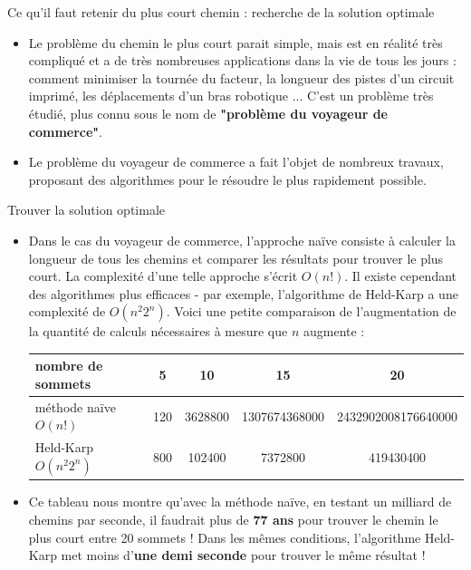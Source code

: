 \begin{frame}{Ce qu'il faut retenir du plus court chemin : recherche de la solution optimale}
  
  \begin{itemize}
    \item Le problème du chemin le plus court parait simple, mais est en réalité très compliqué et a de très nombreuses applications dans la vie de tous les jours : comment minimiser la tournée du facteur, la longueur des pistes d'un circuit imprimé, les déplacements d'un bras robotique ... C'est un problème très étudié, plus connu sous le nom de \textbf{"problème du voyageur de commerce"}.
    \item Le problème du voyageur de commerce a fait l'objet de nombreux travaux, proposant des algorithmes pour le résoudre le plus rapidement possible.
  \end{itemize}

  \begin{block}{Trouver la solution optimale}
    
    \begin{itemize}
      \item Dans le cas du voyageur de commerce, l'approche naïve consiste à calculer la longueur de tous les chemins et comparer les résultats pour trouver le plus court. La complexité d'une telle approche s'écrit $O(n!)$. Il existe cependant des algorithmes plus efficaces - par exemple, l'algorithme de Held-Karp a une complexité de $O(n^{2}2^n)$. Voici une petite comparaison de l'augmentation de la quantité de calculs nécessaires à mesure que $n$ augmente :

      \bigskip

      \begin{center}
        \begin{tabular}{|l|cccc|}
          \hline
          nombre de sommets       & 5   & 10      & 15            & 20 \\
          \hline
          méthode naïve $O(n!)$   & 120 & 3628800 & 1307674368000 & 2432902008176640000 \\
          Held-Karp $O(n^{2}2^n)$ & 800 & 102400  & 7372800       & 419430400 \\
          \hline
        \end{tabular} 
      \end{center}

      \bigskip

      \item Ce tableau nous montre qu'avec la méthode naïve, en testant un milliard de chemins par seconde, il faudrait plus de \textbf{77 ans} pour trouver le chemin le plus court entre 20 sommets ! Dans les mêmes conditions, l'algorithme Held-Karp met moins d'\textbf{une demi seconde} pour trouver le même résultat !
    \end{itemize}
  \end{block}


\end{frame}
